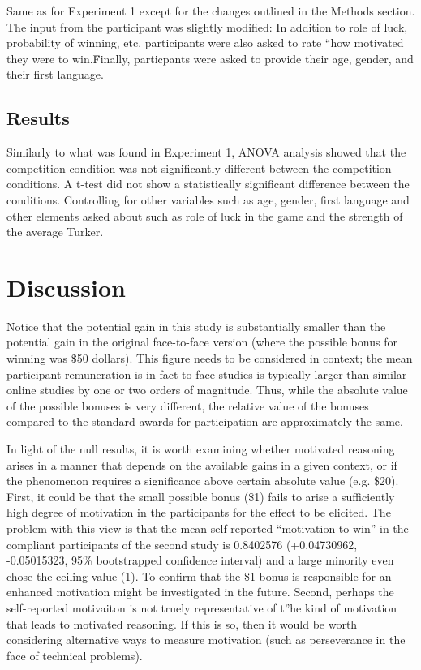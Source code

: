 \documentclass{article}
\begin{document}
Same as for Experiment 1 except for the changes outlined in the Methods section. The input from the participant was slightly modified: In addition to role of luck, probability of winning, etc. participants were also asked to rate ``how motivated they were to win.\" Finally, particpants were asked to provide their age, gender, and their first language. 

\subsection{Results}


Similarly to what was found in Experiment 1, ANOVA analysis showed that the competition condition was not significantly different between the competition conditions. A t-test did not show a statistically significant difference between the conditions. Controlling for other variables such as age, gender, first language and other elements asked about such as role of luck in the game and the strength of the average Turker.


\section{Discussion}


Notice that the potential gain in this study is substantially smaller than the potential gain in the original face-to-face version (where the possible bonus for winning was \$50 dollars). This figure needs to be considered in context; the mean participant remuneration is in fact-to-face studies is typically larger than similar online studies by one or two orders of magnitude. Thus, while the absolute value of the possible bonuses is very different, the relative value of the bonuses compared to the standard awards for participation are approximately the same. 

In light of the null results, it is worth examining whether motivated reasoning arises in a manner that depends on the available gains in a given context, or if the phenomenon requires a significance above certain absolute value (e.g. \$20). First, it could be that the small possible bonus (\$1) fails to arise a sufficiently high degree of motivation in the participants for the effect to be elicited. The problem with this view is that the mean self-reported ``motivation to win'' in the compliant participants of the second study is 0.8402576 (+0.04730962, -0.05015323, 95\% bootstrapped confidence interval) and a large minority even chose the ceiling value (1). To confirm that the \$1 bonus is responsible for an enhanced motivation might be investigated in the future. Second, perhaps the self-reported motivaiton is not truely representative of t''he kind of motivation that leads to motivated reasoning. If this is so, then it would be worth considering alternative ways to measure motivation (such as perseverance in the face of technical problems).
\end{document}
